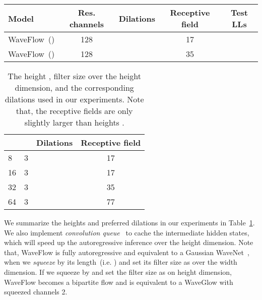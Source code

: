 \documentclass{article}
\begin{document}
\begin{table*}[t!]
\centering
\caption{The test log-likelihoods~(LLs) of WaveFlow with different dilation cycles on the height dimension when . The models are stacked with  flows and each flow has  layers.}
\vspace{0.2em}
\begin{tabular}{l|c|c|c|c}
\hline 
Model & Res. channels  &  Dilations  & Receptive field  & Test LLs
\\ \hline
WaveFlow~() & 128 &  & 17 &  \\ 
WaveFlow~() & 128 &  & 35 &  \\ 
\hline
\end{tabular}
\label{tab:small_receptive_field_poor_ll}
\end{table*}
\begin{table}[t!]
\centering
\vspace{-0.4cm}
\caption{The height , filter size  over the height dimension, and the corresponding dilations used in our experiments. Note that, the receptive fields  are only slightly larger than heights .}
\vspace{0.2em}
\begin{tabular}{l|c|l|c}
\hline 
  &   & \quad Dilations    & Receptive field 
\\ \hline
8  & 3 &  & 17 \\ 
16 & 3 &  & 17 \\ 
32 & 3 &  & 35 \\ 
64 & 3 &  & 77 \\ 
\hline
\end{tabular}
\vspace{-0.15cm}
\label{tab:dilations}
\end{table}



We summarize the heights and preferred dilations in our experiments in Table~\ref{tab:dilations}.
We also implement \emph{convolution queue}~\citep{paine2016fast} to cache the intermediate hidden states, which will speed up the autoregressive inference over the height dimension.
Note that, WaveFlow is fully autoregressive and equivalent to a Gaussian WaveNet~\citep{ping2018clarinet}, when we \emph{squeeze}  by its length~(i.e. ) and set its filter size as  over the width dimension. 
If we squeeze  by  and set the filter size as  on height dimension, WaveFlow becomes a bipartite flow and is equivalent to a WaveGlow with squeezed channels 2.

\vspace{-.2em}
\end{document}
